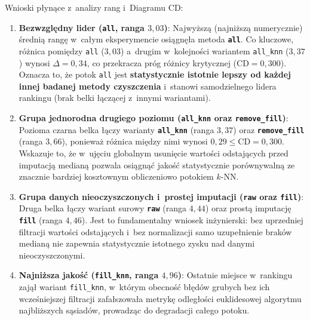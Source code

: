 Wnioski płynące z~analizy rang i~Diagramu CD:
\begin{enumerate}
    \item \textbf{Bezwzględny lider (\texttt{all}, ranga $3{,}03$)}: Najwyższą (najniższą numerycznie) średnią rangę w~całym eksperymencie osiągnęła metoda \textbf{\texttt{all}}. Co kluczowe, różnica pomiędzy \texttt{all} ($3{,}03$) a~drugim w~kolejności wariantem \texttt{all\_knn} ($3{,}37$) wynosi $\Delta = 0{,}34$, co przekracza próg różnicy krytycznej ($\mathrm{CD} = 0{,}300$). Oznacza to, że potok \texttt{all} jest \textbf{statystycznie istotnie lepszy od każdej innej badanej metody czyszczenia} i~stanowi samodzielnego lidera rankingu (brak belki łączącej z~innymi wariantami).
    \item \textbf{Grupa jednorodna drugiego poziomu (\texttt{all\_knn} oraz \texttt{remove\_fill})}: Pozioma czarna belka łączy warianty \textbf{\texttt{all\_knn}} (ranga $3{,}37$) oraz \textbf{\texttt{remove\_fill}} (ranga $3{,}66$), ponieważ różnica między nimi wynosi $0{,}29 \le \mathrm{CD} = 0{,}300$. Wskazuje to, że w~ujęciu globalnym usunięcie wartości odstających przed imputacją medianą pozwala osiągnąć jakość statystycznie porównywalną ze znacznie bardziej kosztownym obliczeniowo potokiem $k$-NN.
    \item \textbf{Grupa danych nieoczyszczonych i~prostej imputacji (\texttt{raw} oraz \texttt{fill})}: Druga belka łączy wariant surowy \textbf{\texttt{raw}} (ranga $4{,}44$) oraz prostą imputację \textbf{\texttt{fill}} (ranga $4{,}46$). Jest to fundamentalny wniosek inżynierski: bez uprzedniej filtracji wartości odstających i~bez normalizacji samo uzupełnienie braków medianą nie zapewnia statystycznie istotnego zysku nad danymi nieoczyszczonymi.
    \item \textbf{Najniższa jakość (\texttt{fill\_knn}, ranga $4{,}96$)}: Ostatnie miejsce w~rankingu zajął wariant \texttt{fill\_knn}, w~którym obecność błędów grubych bez ich wcześniejszej filtracji zafałszowała metrykę odległości euklidesowej algorytmu najbliższych sąsiadów, prowadząc do degradacji całego potoku.
\end{enumerate}

